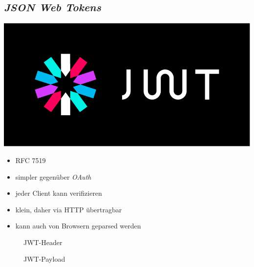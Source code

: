 \documentclass{beamer}
\begin{document}
\subsection{\em JSON Web Tokens}
\begin{frame}{\insertsubsection}
	\centering
	\includegraphics[width=.5\linewidth]{img/jwt}
	\vspace*{12pt}
	\begin{itemize}
		\item RFC 7519 \cite{RFC7519}
		\item simpler gegenüber \textit{OAuth}
		\item jeder Client kann verifizieren
		\item klein, daher via HTTP übertragbar
		\item kann auch von Browsern geparsed werden
	\end{itemize}
\end{frame}
	
\begin{frame}{\insertsubsection}{}%

\begin{figure}
\caption{JWT-Header}
\end{figure}

\begin{figure}
\caption{JWT-Payload}
\end{figure}

\end{frame}
\end{document}

